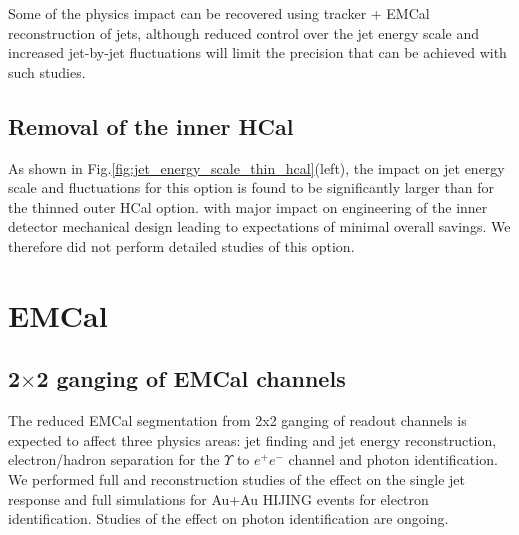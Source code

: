 Some of the physics impact can be recovered using tracker + EMCal reconstruction of jets, although reduced control over the jet 
energy scale and increased jet-by-jet fluctuations will limit the precision that can be achieved with such studies.

\subsection{Removal of the inner HCal}

As shown in Fig.\ref{fig:jet_energy_scale_thin_hcal}(left), the impact on jet energy scale and fluctuations for this option is 
found to be significantly larger than for the thinned outer HCal option. 
with major impact on engineering of the inner detector mechanical design leading to expectations of minimal overall savings.
We therefore did not perform detailed studies of this option.

\section{EMCal}
\subsection{2$\times$2 ganging of EMCal channels}
The reduced EMCal segmentation from 2x2 ganging of readout channels is expected to affect three physics areas: jet finding 
and jet energy reconstruction, electron/hadron separation for the $\Upsilon$ to $e^+ e^-$ channel and photon identification.
We performed full \geant and reconstruction studies of the effect on the single jet response and full \geant simulations for 
Au+Au HIJING events for electron identification. Studies of the effect on photon identification are ongoing.

